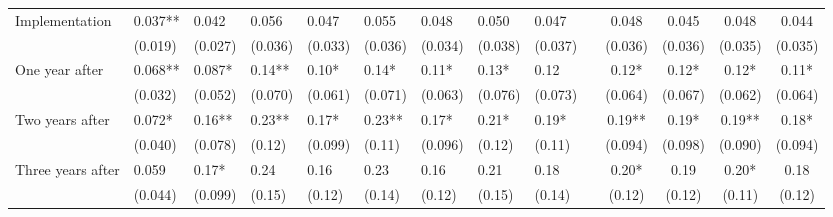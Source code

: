 \begin{tabular}{lccccrrrrrcccc}
Implementation & \multicolumn{1}{l}{0.037**} & \multicolumn{1}{l}{0.042} & \multicolumn{1}{l}{0.056} & \multicolumn{1}{l}{0.047} & \multicolumn{1}{l}{0.055} & \multicolumn{1}{l}{0.048} & \multicolumn{1}{l}{0.050} & \multicolumn{1}{l}{0.047} &       & 0.048 & 0.045 & 0.048 & 0.044 \\
      & \multicolumn{1}{l}{(0.019)} & \multicolumn{1}{l}{(0.027)} & \multicolumn{1}{l}{(0.036)} & \multicolumn{1}{l}{(0.033)} & \multicolumn{1}{l}{(0.036)} & \multicolumn{1}{l}{(0.034)} & \multicolumn{1}{l}{(0.038)} & \multicolumn{1}{l}{(0.037)} &       & (0.036) & (0.036) & (0.035) & (0.035) \\
One year after & \multicolumn{1}{l}{0.068**} & \multicolumn{1}{l}{0.087*} & \multicolumn{1}{l}{0.14**} & \multicolumn{1}{l}{0.10*} & \multicolumn{1}{l}{0.14*} & \multicolumn{1}{l}{0.11*} & \multicolumn{1}{l}{0.13*} & \multicolumn{1}{l}{0.12} &       & 0.12* & 0.12* & 0.12* & 0.11* \\
      & \multicolumn{1}{l}{(0.032)} & \multicolumn{1}{l}{(0.052)} & \multicolumn{1}{l}{(0.070)} & \multicolumn{1}{l}{(0.061)} & \multicolumn{1}{l}{(0.071)} & \multicolumn{1}{l}{(0.063)} & \multicolumn{1}{l}{(0.076)} & \multicolumn{1}{l}{(0.073)} &       & (0.064) & (0.067) & (0.062) & (0.064) \\
Two years after & \multicolumn{1}{l}{0.072*} & \multicolumn{1}{l}{0.16**} & \multicolumn{1}{l}{0.23**} & \multicolumn{1}{l}{0.17*} & \multicolumn{1}{l}{0.23**} & \multicolumn{1}{l}{0.17*} & \multicolumn{1}{l}{0.21*} & \multicolumn{1}{l}{0.19*} &       & 0.19** & 0.19* & 0.19** & 0.18* \\
      & \multicolumn{1}{l}{(0.040)} & \multicolumn{1}{l}{(0.078)} & \multicolumn{1}{l}{(0.12)} & \multicolumn{1}{l}{(0.099)} & \multicolumn{1}{l}{(0.11)} & \multicolumn{1}{l}{(0.096)} & \multicolumn{1}{l}{(0.12)} & \multicolumn{1}{l}{(0.11)} &       & (0.094) & (0.098) & (0.090) & (0.094) \\
Three years after & \multicolumn{1}{l}{0.059} & \multicolumn{1}{l}{0.17*} & \multicolumn{1}{l}{0.24} & \multicolumn{1}{l}{0.16} & \multicolumn{1}{l}{0.23} & \multicolumn{1}{l}{0.16} & \multicolumn{1}{l}{0.21} & \multicolumn{1}{l}{0.18} &       & 0.20* & 0.19  & 0.20* & 0.18 \\
      & \multicolumn{1}{l}{(0.044)} & \multicolumn{1}{l}{(0.099)} & \multicolumn{1}{l}{(0.15)} & \multicolumn{1}{l}{(0.12)} & \multicolumn{1}{l}{(0.14)} & \multicolumn{1}{l}{(0.12)} & \multicolumn{1}{l}{(0.15)} & \multicolumn{1}{l}{(0.14)} &       & (0.12) & (0.12) & (0.11) & (0.12) \\

\end{tabular}
